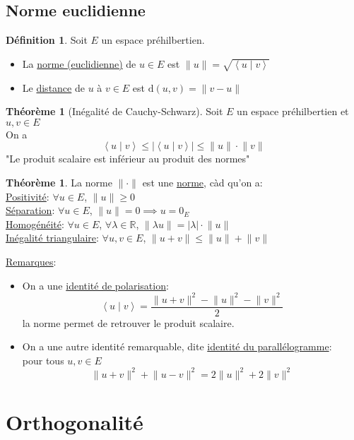 \documentclass[10pt,a4paper]{article}
\theoremstyle{definition}
\newtheorem{theorem}[proposition]{Théorème}
\newtheorem{definition}[proposition]{Définition}
\newcommand{\vp}[2]{\left< #1 \mid #2 \right>}
\begin{document}
\subsection{Norme euclidienne}
\begin{definition}
Soit $E$ un espace préhilbertien.
\begin{itemize}
\item La \uline{norme (euclidienne)} de $u \in E$ est $\lVert u \rVert = \sqrt{\vp{u}{v}}$
\item Le \uline{distance} de $u$ à $v \in E$ est $\text{d}(u, v) = \lVert v - u \rVert$
\end{itemize}
\end{definition}
\begin{theorem}[Inégalité de Cauchy-Schwarz]
Soit $E$ un espace préhilbertien et $u, v \in E$ \\
On a
\[ \vp{u}{v} \leq \left| \vp{u}{v} \right| \leq \lVert u \rVert \cdot \lVert v \rVert \]
"Le produit scalaire est inférieur au produit des normes"
\end{theorem}
\begin{theorem}
La norme $\lVert \cdot \rVert$ est une \uline{norme}, càd qu'on a: \\
\uline{Positivité}: $\forall u \in E$, $\lVert u \rVert \geq 0$ \\
\uline{Séparation}: $\forall u \in E$, $\lVert u \rVert = 0 \implies u = 0_E$ \\
\uline{Homogénéité}: $\forall u \in E$, $\forall \lambda \in \mathbb{R}$, $\lVert \lambda u \rVert = |\lambda| \cdot \lVert u \rVert$ \\
\uline{Inégalité triangulaire}: $\forall u, v \in E$, $\lVert u + v \rVert \leq \lVert u \rVert + \lVert v \rVert$
\end{theorem}
\noindent \uline{Remarques}:
\begin{itemize}
\item On a une \uline{identité de polarisation}:
\[ \vp{u}{v} = \frac{\lVert u + v \rVert^2 - \lVert u \rVert^2 - \lVert v \rVert^2}{2} \]
la norme permet de retrouver le produit scalaire.
\item On a une autre identité remarquable, dite \uline{identité du parallélogramme}: \\
pour tous $u, v \in E$
\[ \lVert u + v \rVert^2 + \lVert u - v \rVert^2 = 2 \lVert u \rVert^2 + 2 \lVert v \rVert^2 \]
\end{itemize}

\pagebreak

\section{Orthogonalité}
\end{document}
